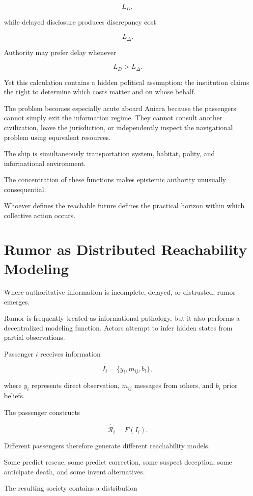 \documentclass[11pt,oneside]{book}
\theoremstyle{definition}
\theoremstyle{remark}
\newcommand{\R}{\mathcal{R}}
\begin{document}
\[
L_D,
\]

while delayed disclosure produces discrepancy cost

\[
L_\Delta.
\]

Authority may prefer delay whenever

\[
L_D>L_\Delta.
\]

Yet this calculation contains a hidden political assumption: the institution claims the right to determine which costs matter and on whose behalf.

The problem becomes especially acute aboard Aniara because the passengers cannot simply exit the information regime. They cannot consult another civilization, leave the jurisdiction, or independently inspect the navigational problem using equivalent resources.

The ship is simultaneously transportation system, habitat, polity, and informational environment.

The concentration of these functions makes epistemic authority unusually consequential.

Whoever defines the reachable future defines the practical horizon within which collective action occurs.

\section{Rumor as Distributed Reachability Modeling}

Where authoritative information is incomplete, delayed, or distrusted, rumor emerges.

Rumor is frequently treated as informational pathology, but it also performs a decentralized modeling function. Actors attempt to infer hidden states from partial observations.

Passenger \(i\) receives information

\[
I_i
=
\{
y_i,
m_{ij},
b_i
\},
\]

where \(y_i\) represents direct observation, \(m_{ij}\) messages from others, and \(b_i\) prior beliefs.

The passenger constructs

\[
\widehat{\R}_i
=
F(I_i).
\]

Different passengers therefore generate different reachability models.

Some predict rescue, some predict correction, some suspect deception, some anticipate death, and some invent alternatives.

The resulting society contains a distribution
\end{document}
